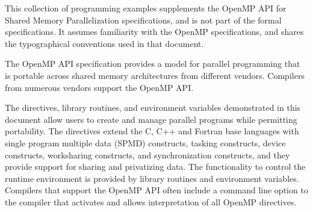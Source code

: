 %
%
%
%
%
%
%
%
%
%

\label{chap:introduction}

This collection of programming examples supplements the OpenMP API for Shared
Memory Parallelization specifications, and is not part of the formal specifications. It
assumes familiarity with the OpenMP specifications, and shares the typographical
conventions used in that document.

The OpenMP API specification provides a model for parallel programming that is
portable across shared memory architectures from different vendors. Compilers from
numerous vendors support the OpenMP API.

The directives, library routines, and environment variables demonstrated in this
document allow users to create and manage parallel programs while permitting
portability. The directives extend the C, C++ and Fortran base languages with single
program multiple data (SPMD) constructs, tasking constructs, device constructs,
worksharing constructs, and synchronization constructs, and they provide support for
sharing and privatizing data. The functionality to control the runtime environment is
provided by library routines and environment variables. Compilers that support the
OpenMP API often include a command line option to the compiler that activates and
allows interpretation of all OpenMP directives.

